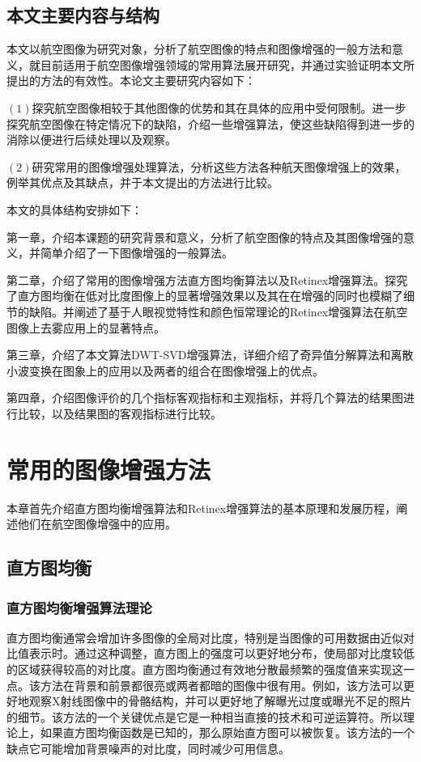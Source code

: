 \documentclass[12pt]{book}
\begin{document}
			\section{本文主要内容与结构}本文以航空图像为研究对象，分析了航空图像的特点和图像增强的一般方法和意义，就目前适用于航空图像增强领域的常用算法展开研究，并通过实验证明本文所提出的方法的有效性。本论文主要研究内容如下：

$(1)$探究航空图像相较于其他图像的优势和其在具体的应用中受何限制。进一步探究航空图像在特定情况下的缺陷，介绍一些增强算法，使这些缺陷得到进一步的消除以便进行后续处理以及观察。

$(2)$研究常用的图像增强处理算法，分析这些方法各种航天图像增强上的效果，例举其优点及其缺点，并于本文提出的方法进行比较。

本文的具体结构安排如下：

第一章，介绍本课题的研究背景和意义，分析了航空图像的特点及其图像增强的意义，并简单介绍了一下图像增强的一般算法。

第二章，介绍了常用的图像增强方法直方图均衡算法以及Retinex增强算法。探究了直方图均衡在低对比度图像上的显著增强效果以及其在在增强的同时也模糊了细节的缺陷。并阐述了基于人眼视觉特性和颜色恒常理论的Retinex增强算法在航空图像上去雾应用上的显著特点。

第三章，介绍了本文算法DWT-SVD增强算法，详细介绍了奇异值分解算法和离散小波变换在图象上的应用以及两者的组合在图像增强上的优点。

第四章，介绍图像评价的几个指标客观指标和主观指标，并将几个算法的结果图进行比较，以及结果图的客观指标进行比较。

	\chapter{常用的图像增强方法}本章首先介绍直方图均衡增强算法和Retinex增强算法的基本原理和发展历程，阐述他们在航空图像增强中的应用。	
		\section{直方图均衡}
			\subsection{直方图均衡增强算法理论}直方图均衡通常会增加许多图像的全局对比度，特别是当图像的可用数据由近似对比值表示时。通过这种调整，直方图上的强度可以更好地分布，使局部对比度较低的区域获得较高的对比度。直方图均衡通过有效地分散最频繁的强度值来实现这一点。该方法在背景和前景都很亮或两者都暗的图像中很有用。例如，该方法可以更好地观察X射线图像中的骨骼结构，并可以更好地了解曝光过度或曝光不足的照片的细节。该方法的一个关键优点是它是一种相当直接的技术和可逆运算符。所以理论上，如果直方图均衡函数是已知的，那么原始直方图可以被恢复。该方法的一个缺点它可能增加背景噪声的对比度，同时减少可用信息。
\end{document}
